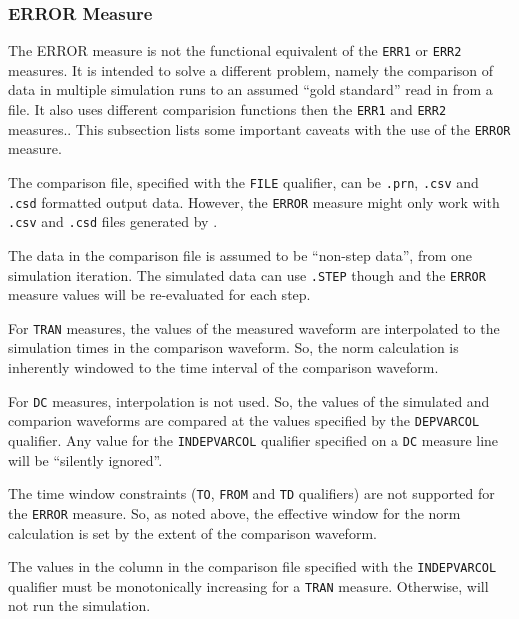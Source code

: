 \subsubsection{ERROR Measure}
\label{Measure_Error_Measure}
The \Xyce{} ERROR measure is not the functional equivalent of the \texttt{ERR1}
or \texttt{ERR2} measures.  It is intended to solve a different problem, namely
the comparison of data in multiple simulation runs to an assumed ``gold standard''
read in from a file.  It also uses different comparision functions then the
\texttt{ERR1} and \texttt{ERR2} measures..  This  subsection lists some important
caveats with the use of the \texttt{ERROR} measure.
\begin{XyceItemize}

  \item The comparison file, specified with the {\tt FILE} qualifier,
    can be {\tt .prn}, {\tt .csv} and {\tt .csd} formatted output
    data.  However, the {\tt ERROR} measure might only work with {\tt
    .csv} and {\tt .csd} files generated by \Xyce{}.  \item The data
    in the comparison file is assumed to be ``non-step data'', from
    one simulation iteration.  The simulated data can use {\tt .STEP}
    though and the {\tt ERROR} measure values will be re-evaluated for
    each step.  \item For {\tt TRAN} measures, the values of the
    measured waveform are interpolated to the simulation times in the
    comparison waveform.  So, the norm calculation is inherently
    windowed to the time interval of the comparison waveform.  \item
    For {\tt DC} measures, interpolation is not used.  So, the values
    of the simulated and comparion waveforms are compared at the
    values specified by the {\tt DEPVARCOL} qualifier.  Any value for
    the {\tt INDEPVARCOL} qualifier specified on a {\tt DC} measure
    line will be ``silently ignored''.

  \item The time window constraints ({\tt TO}, {\tt FROM} and {\tt TD}
    qualifiers) are not supported for the {\tt ERROR} measure.  So, as
    noted above, the effective window for the norm calculation is set
    by the extent of the comparison waveform.

  \item The values in the column in the comparison file specified with
    the {\tt INDEPVARCOL} qualifier must be monotonically increasing
    for a {\tt TRAN} measure.  Otherwise, \Xyce{} will not run the
    simulation.


\end{XyceItemize}
